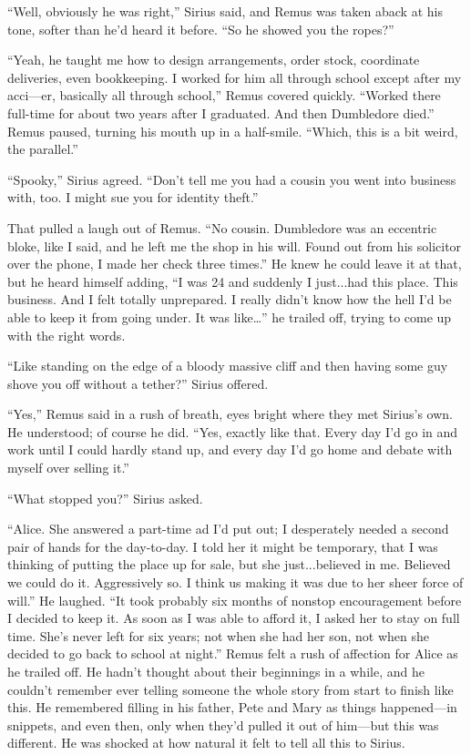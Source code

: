 “Well, obviously he was right,” Sirius said, and Remus was taken aback at his tone, softer than he’d heard it before. “So he showed you the ropes?”

“Yeah, he taught me how to design arrangements, order stock, coordinate deliveries, even bookkeeping. I worked for him all through school except after my acci—er, basically all through school,” Remus covered quickly. “Worked there full-time for about two years after I graduated. And then Dumbledore died.” Remus paused, turning his mouth up in a half-smile. “Which, this is a bit weird, the parallel.”

“Spooky,” Sirius agreed. “Don’t tell me you had a cousin you went into business with, too. I might sue you for identity theft.”

That pulled a laugh out of Remus. “No cousin. Dumbledore was an eccentric bloke, like I said, and he left me the shop in his will. Found out from his solicitor over the phone, I made her check three times.” He knew he could leave it at that, but he heard himself adding, “I was 24 and suddenly I just...had this place. This business. And I felt totally unprepared. I really didn’t know how the hell I’d be able to keep it from going under. It was like…” he trailed off, trying to come up with the right words.

“Like standing on the edge of a bloody massive cliff and then having some guy shove you off without a tether?” Sirius offered.

“Yes,” Remus said in a rush of breath, eyes bright where they met Sirius’s own. He understood; of course he did. “Yes, exactly like that. Every day I’d go in and work until I could hardly stand up, and every day I’d go home and debate with myself over selling it.”

“What stopped you?” Sirius asked.

“Alice. She answered a part-time ad I’d put out; I desperately needed a second pair of hands for the day-to-day. I told her it might be temporary, that I was thinking of putting the place up for sale, but she just...believed in me. Believed we could do it. Aggressively so. I think us making it was due to her sheer force of will.” He laughed. “It took probably six months of nonstop encouragement before I decided to keep it. As soon as I was able to afford it, I asked her to stay on full time. She’s never left for six years; not when she had her son, not when she decided to go back to school at night.” Remus felt a rush of affection for Alice as he trailed off. He hadn’t thought about their beginnings in a while, and he couldn’t remember ever telling someone the whole story from start to finish like this. He remembered filling in his father, Pete and Mary as things happened—in snippets, and even then, only when they’d pulled it out of him—but this was different. He was shocked at how natural it felt to tell all this to Sirius.

